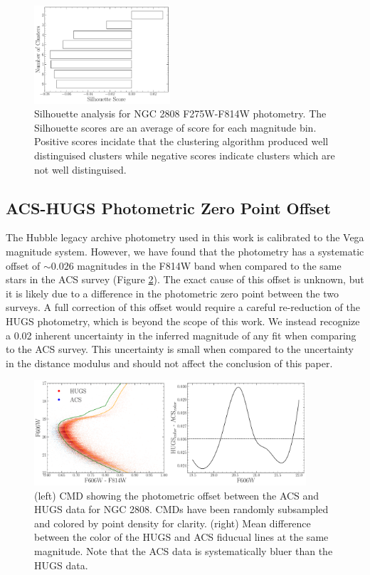 \begin{figure}
  \centering
  \includegraphics[width=0.45\textwidth]{src/figures/ClusterAnalysis.pdf}
  \caption{Silhouette analysis for NGC 2808 F275W-F814W photometry. The Silhouette scores
  are an average of score for each magnitude bin. Positive scores incidate that the clustering
  algorithm produced well distinguised clusters while negative scores indicate clusters which are not
  well distinguised.}
  \label{fig:clusterAn}
\end{figure}


\subsection{ACS-HUGS Photometric Zero Point Offset}
The Hubble legacy archive photometry used in this work is calibrated to the
Vega magnitude system. However, we have found that the photometry has a
systematic offset of $\sim0.026$ magnitudes in the F814W band when
compared to the same stars in the ACS survey (Figure \ref{fig:offset}). The
exact cause of this offset is unknown, but it is likely due to a difference in
the photometric zero point between the two surveys. A full correction of this
offset would require a careful re-reduction of the HUGS photometry, which is
beyond the scope of this work. We instead recognize a 0.02 inherent uncertainty
in the inferred magnitude of any fit when comparing to the ACS survey. This
uncertainty is small when compared to the uncertainty in the
distance modulus and should not affect the conclusion of this
paper. 

\begin{figure}
  \centering
  \includegraphics[width=0.90\textwidth]{src/figures/photometricOffset.pdf}
  \caption{(left) CMD showing the photometric offset between the ACS and HUGS data for NGC 2808. CMDs have been randomly subsampled and colored by point density for clarity. (right) Mean difference between the color of the HUGS and ACS fiducual lines at the same magnitude. Note that the ACS data is systematically bluer than the HUGS data.}
  \label{fig:offset}
\end{figure}

